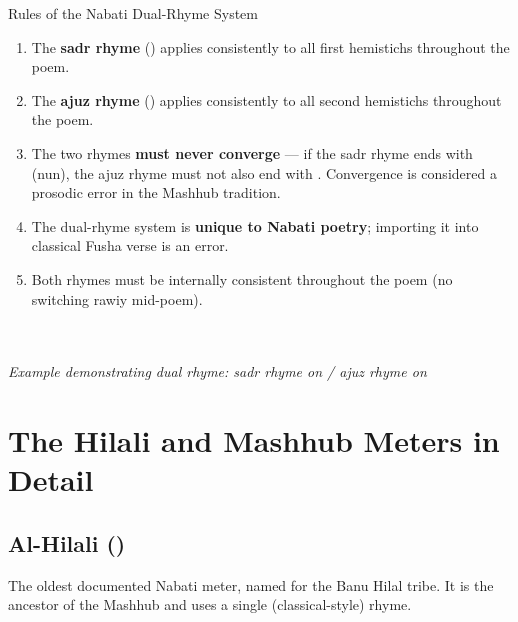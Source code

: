 \begin{rulebox}{Rules of the Nabati Dual-Rhyme System}
\begin{enumerate}
  \item The \textbf{sadr rhyme} () applies consistently to all first hemistichs throughout the poem.
  \item The \textbf{ajuz rhyme} () applies consistently to all second hemistichs throughout the poem.
  \item The two rhymes \textbf{must never converge} — if the sadr rhyme ends with  (nun), the ajuz rhyme must not also end with . Convergence is considered a prosodic error in the Mashhub tradition.
  \item The dual-rhyme system is \textbf{unique to Nabati poetry}; importing it into classical Fusha verse is an error.
  \item Both rhymes must be internally consistent throughout the poem (no switching rawiy mid-poem).
\end{enumerate}
\end{rulebox}

\begin{verseframe}
\centering{}\\[4pt]
\\[2pt]
\small\textit{Example demonstrating dual rhyme: sadr rhyme on  / ajuz rhyme on }
\end{verseframe}

\section{The Hilali and Mashhub Meters in Detail}
\label{sec:hilali_mashhub}

\subsection{Al-Hilali ()}

The oldest documented Nabati meter, named for the Banu Hilal tribe. It is the ancestor of the Mashhub and uses a single (classical-style) rhyme.

